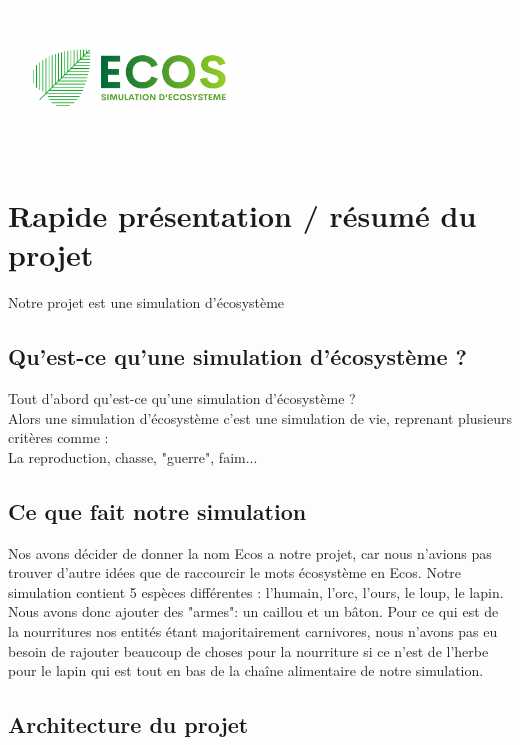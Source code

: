 \documentclass[a4paper, 11pt]{article}
\title{}
\author{CHAMPENOIS Brandon \textsc{G5B} \\ BONVARLET Bastien \textsc{G5B} \\ MASSON Joris \textsc{G5B} }
\begin{document}
\maketitle
\centerline{\includegraphics[width = 7cm]{images/ecos.png}}
\tableofcontents
\newpage

\section{Rapide présentation / résumé du projet}
Notre projet est une simulation d'écosystème\\

\subsection*{Qu'est-ce qu'une simulation d'écosystème ?}
Tout d'abord qu'est-ce qu'une simulation d'écosystème ?\\
Alors une simulation d'écosystème c'est une simulation de vie, reprenant plusieurs critères comme :\\
La reproduction, chasse, "guerre", faim...\\

\subsection{Ce que fait notre simulation}
Nos avons décider de donner la nom Ecos a notre projet, car nous n'avions pas trouver d'autre idées que de raccourcir le mots écosystème en Ecos. Notre simulation contient 5 espèces différentes : l'humain, l'orc, l'ours, le loup, le lapin. Nous avons donc ajouter des "armes": un caillou et un bâton. Pour ce qui est de la nourritures nos entités étant majoritairement carnivores, nous n'avons pas eu besoin de rajouter beaucoup de choses pour la nourriture si ce n'est de l'herbe pour le lapin qui est tout en bas de la chaîne alimentaire de notre simulation.\\
\subsection{Architecture du projet}
\end{document}
